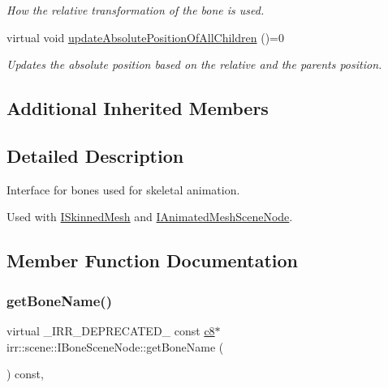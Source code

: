 \begin{DoxyCompactItemize}
\begin{DoxyCompactList}\small\item\em How the relative transformation of the bone is used. \end{DoxyCompactList}\item 
\mbox{\label{classirr_1_1scene_1_1IBoneSceneNode_ab405c67e87dd79b7c1b9c16a6b8c3182}} 
virtual void \hyperlink{classirr_1_1scene_1_1IBoneSceneNode_ab405c67e87dd79b7c1b9c16a6b8c3182}{update\+Absolute\+Position\+Of\+All\+Children} ()=0
\begin{DoxyCompactList}\small\item\em Updates the absolute position based on the relative and the parents position. \end{DoxyCompactList}\end{DoxyCompactItemize}
\subsection*{Additional Inherited Members}


\subsection{Detailed Description}
Interface for bones used for skeletal animation. 

Used with \hyperlink{classirr_1_1scene_1_1ISkinnedMesh}{I\+Skinned\+Mesh} and \hyperlink{classirr_1_1scene_1_1IAnimatedMeshSceneNode}{I\+Animated\+Mesh\+Scene\+Node}. 

\subsection{Member Function Documentation}
\mbox{\label{classirr_1_1scene_1_1IBoneSceneNode_a1c40bee44b89fe81178782e999cbe3a8}} 
\subsubsection{\texorpdfstring{get\+Bone\+Name()}{getBoneName()}}
{\footnotesize\ttfamily virtual \+\_\+\+I\+R\+R\+\_\+\+D\+E\+P\+R\+E\+C\+A\+T\+E\+D\+\_\+ const \hyperlink{namespaceirr_a9395eaea339bcb546b319e9c96bf7410}{c8}$\ast$ irr\+::scene\+::\+I\+Bone\+Scene\+Node\+::get\+Bone\+Name (\begin{DoxyParamCaption}{ }\end{DoxyParamCaption}) const\hspace{0.3cm}{\ttfamily [inline]}, {\ttfamily [virtual]}}



